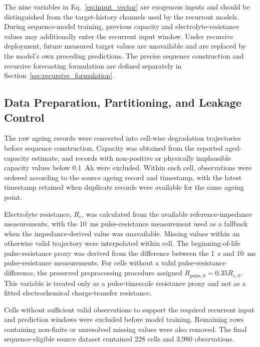 \documentclass[a4paper,fleqn]{cas-sc}
\begin{document}
The nine variables in Eq.~\eqref{eq:input_vector} are exogenous inputs and should be distinguished from the target-history channels used by the recurrent models. During sequence-model training, previous capacity and electrolyte-resistance values may additionally enter the recurrent input window. Under recursive deployment, future measured target values are unavailable and are replaced by the model's own preceding predictions. The precise sequence construction and recursive forecasting formulation are defined separately in Section~\ref{sec:recursive_formulation}.



\subsection{Data Preparation, Partitioning, and Leakage Control}
\label{sec:data_preparation}

The raw ageing records were converted into cell-wise degradation trajectories before sequence construction. Capacity was obtained from the reported aged-capacity estimate, and records with non-positive or physically implausible capacity values below 0.1~Ah were excluded. Within each cell, observations were ordered according to the source ageing record and timestamp, with the latest timestamp retained when duplicate records were available for the same ageing point.

Electrolyte resistance, $R_e$, was calculated from the available reference-impedance measurements, with the 10~ms pulse-resistance measurement used as a fallback when the impedance-derived value was unavailable. Missing values within an otherwise valid trajectory were interpolated within cell. The beginning-of-life pulse-resistance proxy was derived from the difference between the 1~s and 10~ms pulse-resistance measurements. For cells without a valid pulse-resistance difference, the preserved preprocessing procedure assigned $R_{\mathrm{pulse},0}=0.35R_{e,0}$. This variable is treated only as a pulse-timescale resistance proxy and not as a fitted electrochemical charge-transfer resistance.

Cells without sufficient valid observations to support the required recurrent input and prediction windows were excluded before model training. Remaining rows containing non-finite or unresolved missing values were also removed. The final sequence-eligible source dataset contained 228 cells and 3,980 observations.
\end{document}
